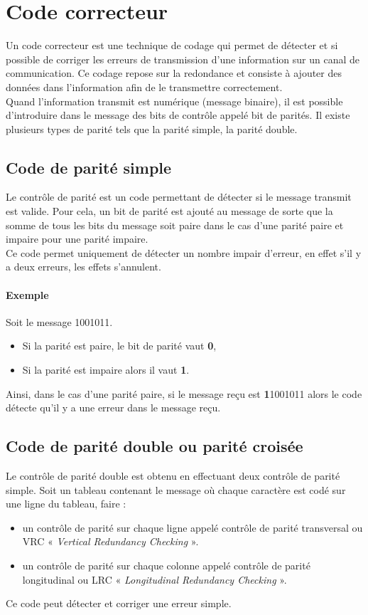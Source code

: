 \documentclass[a4paper, 12pt]{article}
\begin{document}
	\section{Code correcteur}

	Un code correcteur est une technique de codage qui permet de détecter et si possible de corriger les erreurs de transmission d’une information sur un canal de communication. Ce codage repose sur la redondance et consiste à ajouter des données dans l’information afin de le transmettre correctement.\\
	Quand l’information transmit est numérique (message binaire), il est possible d’introduire dans le message des bits de contrôle appelé bit de parités. Il existe plusieurs types de parité tels que la parité simple, la parité double.

	\subsection{Code de parité simple}
	Le contrôle de parité est un code permettant de détecter si le message transmit est valide. Pour cela, un bit de parité est ajouté au message de sorte que la somme de tous les bits du message soit paire dans le cas d’une parité paire et impaire pour une parité impaire.\\
	Ce code permet uniquement de détecter un nombre impair d’erreur, en effet s’il y a deux erreurs, les effets s’annulent.

	\paragraph{Exemple}
	Soit le message 1001011.
	\begin{itemize}
		\item Si la parité est paire, le bit de parité vaut \textbf{0},
		\item Si la parité est impaire alors il vaut \textbf{1}.
	\end{itemize}
	Ainsi, dans le cas d’une parité paire, si le message reçu est \textbf{1}1001011 alors le code détecte qu’il y a une erreur dans le message reçu.

	\subsection{Code de parité double ou parité croisée}
	Le contrôle de parité double est obtenu en effectuant deux contrôle de parité simple.
	Soit un tableau contenant le message où chaque caractère est codé sur une ligne du tableau, faire :
	\begin{itemize}
		\item un contrôle de parité sur chaque ligne appelé contrôle de parité transversal ou VRC « \textit{Vertical Redundancy Checking} ».
		\item un contrôle de parité sur chaque colonne appelé contrôle de parité longitudinal ou LRC « \textit{Longitudinal Redundancy Checking} ».
	\end{itemize}
	Ce code peut détecter et corriger une erreur simple.
\end{document}
